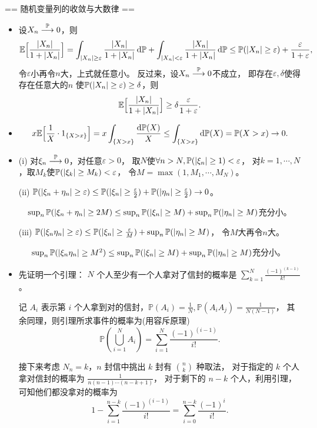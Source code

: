 == 随机变量列的收敛与大数律 ==
\begin{itemize}
    \item[10.2]设$X_n\stackrel{\mathbb{P}}{\longrightarrow}0$，则
    $$\mathbb{E}\Big[\frac{|X_n|}{1+|X_n|}\Big]
    =\int_{|X_n|\ge\varepsilon}\frac{|X_n|}{1+|X_n|}\,{\rm d}\mathbb{P}
    +\int_{|X_n|<\varepsilon}\frac{|X_n|}{1+|X_n|}\,{\rm d}\mathbb{P}
    \le\mathbb{P}(|X_n|\ge\varepsilon)+\frac{\varepsilon}{1+\varepsilon},$$
    令$\varepsilon$小再令$n$大，上式就任意小。
    反过来，设$X_n\stackrel{\mathbb{P}}{\longrightarrow}0$不成立，
    即存在$\varepsilon,\delta$使得存在任意大的$n$
    使$\mathbb{P}(|X_n|\ge\varepsilon)\ge\delta$，则
    $$\mathbb{E}\Big[\frac{|X_n|}{1+|X_n|}\Big]
    \ge\delta\frac{\varepsilon}{1+\varepsilon}.$$

    \item[10.3]
    $$x\mathbb{E}\Big[\frac{1}{X}\cdot1_{\{X>x\}}\Big]
    =x\int_{\{X>x\}}\frac{{\rm d}\mathbb{P}(X)}{X}
    \le\int_{\{X>x\}}{\rm d}\mathbb{P}(X)=\mathbb{P}(X>x)\to0.$$

    \item[10.20]
    (i) 对$\xi_n\stackrel{\mathbb{P}}{\longrightarrow}0$，对任意$\varepsilon>0$，
    取$N$使$\forall n>N,\mathbb{P}(|\xi_n|\ge1)<\varepsilon$，
    对$k=1,\cdots,N$，取$M_k$使$\mathbb{P}(|\xi_k|\ge M_k)<\varepsilon$，
    令$M=\max(1,M_1,\cdots,M_N)$。

    (ii) $\mathbb{P}(|\xi_n+\eta_n|\ge\varepsilon)
    \le\mathbb{P}(|\xi_n|\ge\frac{\varepsilon}{2})
    +\mathbb{P}(|\eta_n|\ge\frac{\varepsilon}{2})\to0$。

    \quad\ \ $\sup_n\mathbb{P}(|\xi_n+\eta_n|\ge2M)
    \le\sup_n\mathbb{P}(|\xi_n|\ge M)+\sup_n\mathbb{P}(|\eta_n|\ge M)$充分小。

    (iii) $\mathbb{P}(|\xi_n\eta_n|\ge\varepsilon)
    \le\mathbb{P}(|\xi_n|\ge\frac{\varepsilon}{M})+\sup_n\mathbb{P}(|\eta_n|\ge M)$，
    令$M$大再令$n$大。

    \quad\ \ \ $\sup_n\mathbb{P}(|\xi_n\eta_n|\ge M^2)
    \le\sup_n\mathbb{P}(|\xi_n|\ge M)+\sup_n\mathbb{P}(|\eta_n|\ge M)$充分小。
    
    \item[10.28]
   
    先证明一个引理： $N$ 个人至少有一个人拿对了信封的概率是
    $\displaystyle \sum_{k=1}^{N} \frac{(-1)^{(k-1)}}{k!}$。
    
    
    记 $A_{i}$ 表示第 $i$ 个人拿到对的信封，$\mathbb{P}(A_{i})=\frac{1}{N}, \mathbb{P}(A_{i} A_{j})=\frac{1}{N(N-1)}$，
    其余同理，则引理所求事件的概率为(用容斥原理)
    \[\mathbb{P}\left(\bigcup_{i=1}^{N} A_{i}\right)=\sum_{i=1}^{N} \frac{(-1)^{(i-1)}}{i!}.\]
    
    接下来考虑  $N_{n}=k$，$n$ 封信中挑出 $k$ 封有 $\binom{n}{k}$ 种取法，
    对于指定的 $k$ 个人拿对信封的概率为  $\frac{1}{n(n-1) \cdots(n-k+1)}$，
    对于剩下的  $n-k$ 个人，利用引理，可知他们都没拿对的概率为
    \[1-\sum_{i=1}^{n-k} \frac{(-1)^{(i-1)}}{i!}=\sum_{i=0}^{n-k} \frac{(-1)^{i}}{i!}.\]
    

\end{itemize}
